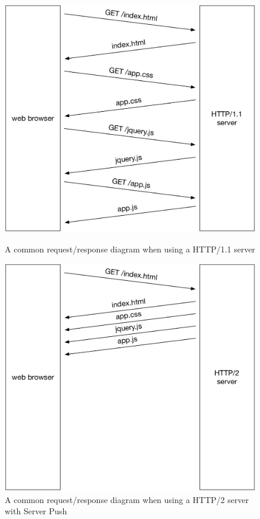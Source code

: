 \begin{figure}
  \centering
  \begin{minipage}[t]{0.49\textwidth}
    \includegraphics[width=\textwidth]{images/http1_server}
    \caption{A common request/response diagram when using a HTTP/1.1 server}
    \label{fig:http1_server}
  \end{minipage}
  \hfill
  \begin{minipage}[t]{0.49\textwidth}
    \includegraphics[width=\textwidth]{images/http2_server}
    \caption{A common request/response diagram when using a HTTP/2 server with Server Push}
    \label{fig:http2_server}
  \end{minipage}
\end{figure}

